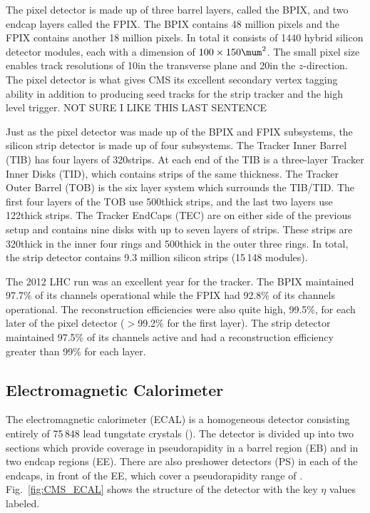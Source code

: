 The pixel detector is made up of three barrel layers, called the BPIX, and two endcap layers called the FPIX.
The BPIX contains 48 million pixels and the FPIX contains another 18 million pixels.
In total it consists of 1440 hybrid silicon detector modules, each with a dimension of $100\times150\mum^{2}$.
The small pixel size enables track resolutions of 10\mum in the transverse plane and 20\mum in the $z$-direction.
The pixel detector is what gives CMS its excellent secondary vertex tagging ability in addition to producing seed tracks for the strip tracker and the high level trigger.
NOT SURE I LIKE THIS LAST SENTENCE

Just as the pixel detector was made up of the BPIX and FPIX subsystems, the silicon strip detector is made up of four subsystems.
The Tracker Inner Barrel
(TIB) has four layers of 320\mum strips.
At each end of the TIB is a three-layer Tracker Inner Disks (TID), which contains strips of the same thickness.
The Tracker Outer Barrel (TOB) is the six layer system which surrounds the TIB/TID.
The first four layers of the TOB use 500\mum thick strips, and the last two layers use 122\mum thick strips.
The Tracker EndCaps (TEC) are on either side of the previous setup and contains nine disks with up to seven layers of strips.
These strips are 320\mum thick in the inner four rings and 500\mum thick in the outer three rings.
In total, the strip detector contains 9.3 million silicon strips (15\,148 modules).

The 2012 LHC run was an excellent year for the tracker.
The BPIX maintained 97.7\% of its channels operational while the FPIX had 92.8\% of its channels operational.
The reconstruction efficiencies were also quite high, 99.5\%, for each later of the pixel detector ($>$99.2\% for the first layer).
The strip detector maintained 97.5\% of its channels active and had a reconstruction efficiency greater than 99\% for each layer\cite{Veszpremi:2014hpa}. 

\subsection{Electromagnetic Calorimeter}

The electromagnetic calorimeter (ECAL) is a homogeneous detector consisting entirely of 75\,848 lead tungstate crystals (\PbWO).
The detector is divided up into two sections which provide coverage in pseudorapidity  in a barrel region (EB) and  in two endcap regions (EE).
There are also preshower detectors (PS) in each of the endcaps, in front of the EE, which cover a pseudorapidity range of .
Fig.~\ref{fig:CMS_ECAL} shows the structure of the detector with the key $\eta$ values labeled.

